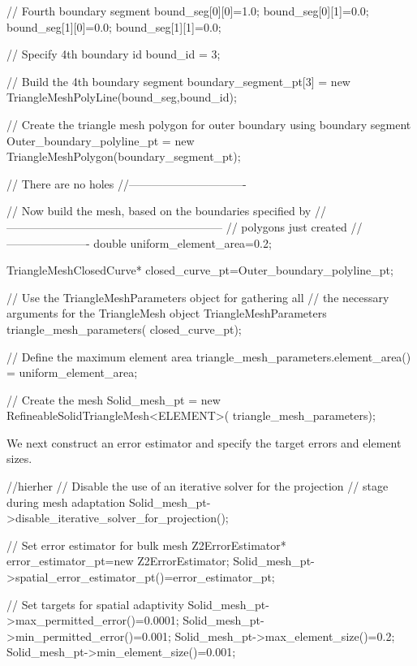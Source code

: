 \begin{DoxyCodeInclude}
 \textcolor{comment}{// Fourth boundary segment}
 bound\_seg[0][0]=1.0;
 bound\_seg[0][1]=0.0;
 bound\_seg[1][0]=0.0;
 bound\_seg[1][1]=0.0;

 \textcolor{comment}{// Specify 4th boundary id}
 bound\_id = 3;

 \textcolor{comment}{// Build the 4th boundary segment}
 boundary\_segment\_pt[3] = \textcolor{keyword}{new} TriangleMeshPolyLine(bound\_seg,bound\_id);
  
 \textcolor{comment}{// Create the triangle mesh polygon for outer boundary using boundary segment}
 Outer\_boundary\_polyline\_pt = \textcolor{keyword}{new} TriangleMeshPolygon(boundary\_segment\_pt);


 \textcolor{comment}{// There are no holes}
 \textcolor{comment}{//-------------------------------}
 
 \textcolor{comment}{// Now build the mesh, based on the boundaries specified by}
 \textcolor{comment}{//---------------------------------------------------------}
 \textcolor{comment}{// polygons just created}
 \textcolor{comment}{//----------------------}
 \textcolor{keywordtype}{double} uniform\_element\_area=0.2;

 TriangleMeshClosedCurve* closed\_curve\_pt=Outer\_boundary\_polyline\_pt;

 \textcolor{comment}{// Use the TriangleMeshParameters object for gathering all}
 \textcolor{comment}{// the necessary arguments for the TriangleMesh object}
 TriangleMeshParameters triangle\_mesh\_parameters(
   closed\_curve\_pt);

 \textcolor{comment}{// Define the maximum element area}
 triangle\_mesh\_parameters.element\_area() =
   uniform\_element\_area;

 \textcolor{comment}{// Create the mesh}
 Solid\_mesh\_pt =
   \textcolor{keyword}{new} RefineableSolidTriangleMesh<ELEMENT>(
     triangle\_mesh\_parameters);

\end{DoxyCodeInclude}


We next construct an error estimator and specify the target errors and element sizes.


\begin{DoxyCodeInclude}
 
 \textcolor{comment}{//hierher}
 \textcolor{comment}{// Disable the use of an iterative solver for the projection}
 \textcolor{comment}{// stage during mesh adaptation}
 Solid\_mesh\_pt->disable\_iterative\_solver\_for\_projection();
 
 \textcolor{comment}{// Set error estimator for bulk mesh}
 Z2ErrorEstimator* error\_estimator\_pt=\textcolor{keyword}{new} Z2ErrorEstimator;
 Solid\_mesh\_pt->spatial\_error\_estimator\_pt()=error\_estimator\_pt;


 \textcolor{comment}{// Set targets for spatial adaptivity}
 Solid\_mesh\_pt->max\_permitted\_error()=0.0001;
 Solid\_mesh\_pt->min\_permitted\_error()=0.001; 
 Solid\_mesh\_pt->max\_element\_size()=0.2;
 Solid\_mesh\_pt->min\_element\_size()=0.001; 

\end{DoxyCodeInclude}


